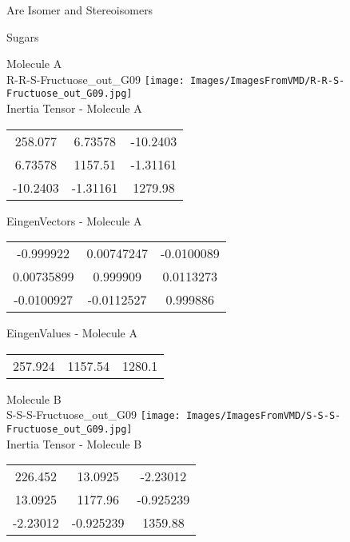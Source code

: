 \begin{center}
\vtab
\vtab
\textcolor{NavyBlue}{\Large Are Isomer and Stereoisomers}
\end{center}
\newpage

\vtab[-2cm]
\begin{center}
{\large Sugars}
\end{center}
\begin{multicols}{2}
\begin{center}
Molecule A \\ 
R-R-S-Fructuose\_out\_G09
\texttt{[image: Images/ImagesFromVMD/R-R-S-Fructuose\_out\_G09.jpg]}
\\
Inertia Tensor - Molecule A \\
\vtab
\begin{tabular}{|c c c|}
258.077	 & 	6.73578	 & 	-10.2403	 \\
6.73578	 & 	1157.51	 & 	-1.31161	 \\
-10.2403	 & 	-1.31161	 & 	1279.98
\end{tabular}

\vtab
 EingenVectors - Molecule A     \\
\vtab
\begin{tabular}{|c c c|}
-0.999922	 & 	0.00747247	 & 	-0.0100089	 \\
0.00735899	 & 	0.999909	 & 	0.0113273	 \\
-0.0100927	 & 	-0.0112527	 & 	0.999886
\end{tabular}

\vtab
 EingenValues - Molecule A     \\
\vtab
\begin{tabular}{|c c c|}
257.924	 & 	1157.54	 & 	1280.1
\end{tabular}
\columnbreak

Molecule B \\ 
S-S-S-Fructuose\_out\_G09
\texttt{[image: Images/ImagesFromVMD/S-S-S-Fructuose\_out\_G09.jpg]}
\\
Inertia Tensor - Molecule B \\
\vtab
\begin{tabular}{|c c c|}
226.452	 & 	13.0925	 & 	-2.23012	 \\
13.0925	 & 	1177.96	 & 	-0.925239	 \\
-2.23012	 & 	-0.925239	 & 	1359.88
\end{tabular}


\end{center}
\end{multicols}
